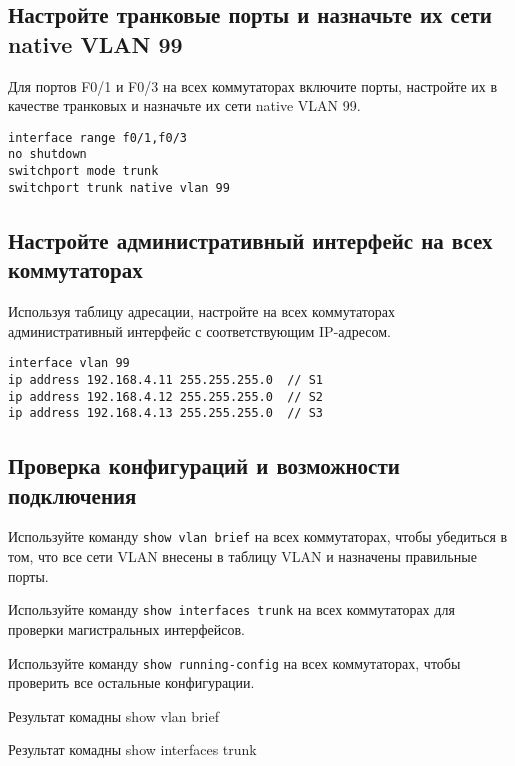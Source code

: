 \subsection{Настройте транковые порты и назначьте их сети native VLAN 99}

Для портов F0/1 и F0/3 на всех коммутаторах включите порты,
настройте их в качестве транковых и назначьте их сети native VLAN 99.

\begin{verbatim}
interface range f0/1,f0/3
no shutdown
switchport mode trunk
switchport trunk native vlan 99
\end{verbatim}

\subsection{Настройте административный интерфейс на всех коммутаторах}

Используя таблицу адресации, настройте на всех коммутаторах административный
интерфейс с соответствующим IP-адресом.

\begin{verbatim}
interface vlan 99
ip address 192.168.4.11 255.255.255.0  // S1
ip address 192.168.4.12 255.255.255.0  // S2
ip address 192.168.4.13 255.255.255.0  // S3
\end{verbatim}

\subsection{Проверка конфигураций и возможности подключения}

Используйте команду \texttt{show vlan brief} на всех коммутаторах,
чтобы убедиться в том, что все сети VLAN внесены в таблицу VLAN
и назначены правильные порты.\par
Используйте команду \texttt{show interfaces trunk} на всех коммутаторах
для проверки магистральных интерфейсов.\par
Используйте команду \texttt{show running-config} на всех коммутаторах,
чтобы проверить все остальные конфигурации.

\begin{image}
	\caption{Результат комадны show vlan brief}
\end{image}

\begin{image}
	\caption{Результат комадны show interfaces trunk}
\end{image}


